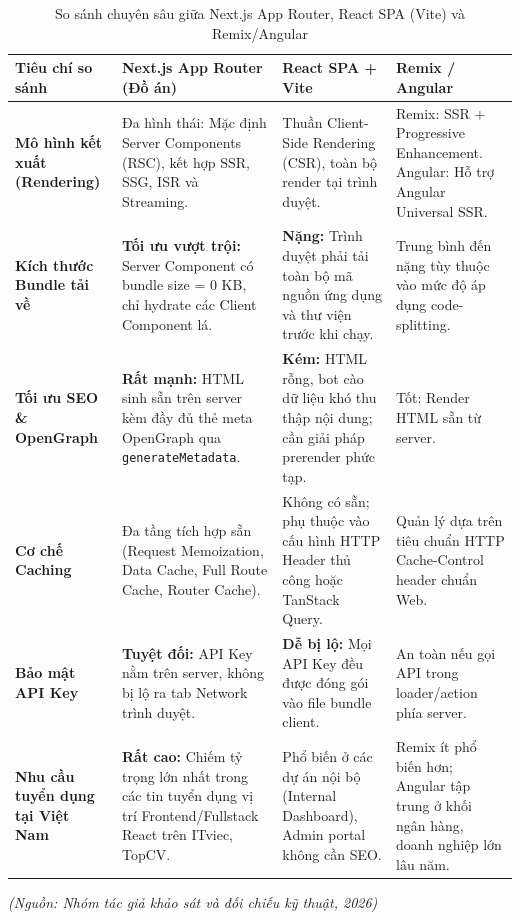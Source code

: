 \documentclass[13pt,a4paper]{extarticle}
\begin{document}
\begin{table}[H]
\centering
\caption{So sánh chuyên sâu giữa Next.js App Router, React SPA (Vite) và Remix/Angular}
\label{tab:tech_compare}
\begin{tabularx}{\textwidth}{>{\raggedright\arraybackslash}p{3.2cm}>{\raggedright\arraybackslash}X>{\raggedright\arraybackslash}p{4cm}>{\raggedright\arraybackslash}p{3.8cm}}
\toprule
\textbf{Tiêu chí so sánh} & \textbf{Next.js App Router (Đồ án)} & \textbf{React SPA + Vite} & \textbf{Remix / Angular} \\
\midrule
\textbf{Mô hình kết xuất (Rendering)} & Đa hình thái: Mặc định Server Components (RSC), kết hợp SSR, SSG, ISR và Streaming. & Thuần Client-Side Rendering (CSR), toàn bộ render tại trình duyệt. & Remix: SSR + Progressive Enhancement. Angular: Hỗ trợ Angular Universal SSR. \\
\midrule
\textbf{Kích thước Bundle tải về} & \textbf{Tối ưu vượt trội:} Server Component có bundle size = 0 KB, chỉ hydrate các Client Component lá. & \textbf{Nặng:} Trình duyệt phải tải toàn bộ mã nguồn ứng dụng và thư viện trước khi chạy. & Trung bình đến nặng tùy thuộc vào mức độ áp dụng code-splitting. \\
\midrule
\textbf{Tối ưu SEO \& OpenGraph} & \textbf{Rất mạnh:} HTML sinh sẵn trên server kèm đầy đủ thẻ meta OpenGraph qua \texttt{generateMetadata}. & \textbf{Kém:} HTML rỗng, bot cào dữ liệu khó thu thập nội dung; cần giải pháp prerender phức tạp. & Tốt: Render HTML sẵn từ server. \\
\midrule
\textbf{Cơ chế Caching} & Đa tầng tích hợp sẵn (Request Memoization, Data Cache, Full Route Cache, Router Cache). & Không có sẵn; phụ thuộc vào cấu hình HTTP Header thủ công hoặc TanStack Query. & Quản lý dựa trên tiêu chuẩn HTTP Cache-Control header chuẩn Web. \\
\midrule
\textbf{Bảo mật API Key} & \textbf{Tuyệt đối:} API Key nằm trên server, không bị lộ ra tab Network trình duyệt. & \textbf{Dễ bị lộ:} Mọi API Key đều được đóng gói vào file bundle client. & An toàn nếu gọi API trong loader/action phía server. \\
\midrule
\textbf{Nhu cầu tuyển dụng tại Việt Nam} & \textbf{Rất cao:} Chiếm tỷ trọng lớn nhất trong các tin tuyển dụng vị trí Frontend/Fullstack React trên ITviec, TopCV. & Phổ biến ở các dự án nội bộ (Internal Dashboard), Admin portal không cần SEO. & Remix ít phổ biến hơn; Angular tập trung ở khối ngân hàng, doanh nghiệp lớn lâu năm. \\
\bottomrule
\end{tabularx}
\end{table}
\begin{flushleft}\small\textit{(Nguồn: Nhóm tác giả khảo sát và đối chiếu kỹ thuật, 2026)}\end{flushleft}
\end{document}
